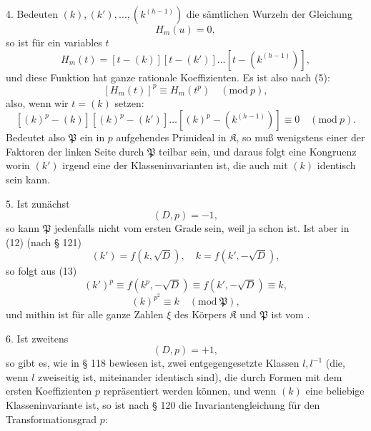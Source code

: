 4. Bedeuten $(k), (k'), \ldots, (k^{(h-1)})$ die sämtlichen Wurzeln der
Gleichung
\[
H_m(u) = 0,
\]
so ist für ein variables $t$
\[
H_m(t) = [t - (k)] [t - (k')] \ldots [t - (k^{(h-1)})],
\]
und diese Funktion hat ganze rationale Koeffizienten. Es ist
also nach (5):
\[
[H_m(t)]^p \equiv H_m(t^p) \quad (\mathrm{mod}\ p),
\]
also, wenn wir $t = (k)$ setzen:
\[
[(k)^p - (k)] [(k)^p - (k')] \ldots [(k)^p - (k^{(h-1)})] \equiv 0 \quad (\mathrm{mod}\ p).
\]
Bedeutet also $\mathfrak P$ ein in $p$ aufgehendes Primideal in $\mathfrak K$, so muß
wenigstens einer der Faktoren der linken Seite durch $\mathfrak P$ teilbar
sein, und daraus folgt eine Kongruenz
worin $(k')$ irgend eine der Klasseninvarianten ist, die auch mit
$(k)$ identisch sein kann.

5. Ist zunächst
\[
(D, p) = -1,
\]
so kann $\mathfrak P$ jedenfalls nicht vom ersten Grade sein, weil ja schon
ist. Ist aber in (12) (nach § 121)
\[
(k') = f(k, \sqrt{D}), \quad k = f(k', -\sqrt{D}),
\]
so folgt aus (13)
\[
(k')^p \equiv f(k^p, -\sqrt{D}) \equiv f(k', -\sqrt{D}) \equiv k,
\]
\[
(k)^{p^2} \equiv k \quad (\mathrm{mod}\ \mathfrak P),
\]
und mithin ist für alle ganze Zahlen $\xi$ des Körpers $\mathfrak K$
und $\mathfrak P$ ist vom .

6. Ist zweitens
\[
(D, p) = +1,
\]
so gibt es, wie in § 118 bewiesen ist, zwei entgegengesetzte Klassen
$l, l^{-1}$ (die, wenn $l$ zweiseitig ist, miteinander identisch sind), die
durch Formen mit dem ersten Koeffizienten $p$ repräsentiert
werden können, und wenn $(k)$ eine beliebige Klasseninvariante
ist, so ist nach § 120 die Invariantengleichung für den Transformationsgrad $p$:
